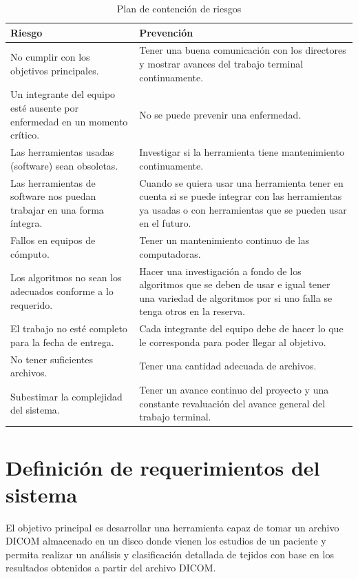 \documentclass[12pt]{report}
\begin{document}
\begin{table}[H]
\begin{center}
\begin{tabular}{|p{70mm}|p{70mm}|}
\hline
 Riesgo & Prevención \\
\hline \hline 
No cumplir con los objetivos principales. & Tener una buena comunicación con los directores y mostrar avances del trabajo terminal continuamente.\\
\hline
Un integrante del equipo esté ausente por enfermedad en un momento crítico. & No se puede prevenir una enfermedad.\\
\hline
Las herramientas usadas (software) sean obsoletas. & Investigar si la herramienta tiene mantenimiento continuamente. \\
\hline
Las herramientas de software nos puedan trabajar en una forma íntegra. & Cuando se quiera usar una herramienta tener en cuenta si se puede integrar con las herramientas ya usadas o con herramientas que se pueden usar en el futuro.\\
\hline
Fallos en equipos de cómputo. & Tener un mantenimiento continuo de las computadoras.\\
\hline
Los algoritmos no sean los adecuados conforme a lo requerido. & Hacer una investigación a fondo de los algoritmos que se deben de usar e igual tener una variedad de algoritmos por si uno falla se tenga otros en la reserva.\\
\hline
El trabajo no esté completo para la fecha de entrega. & Cada integrante del equipo debe de hacer lo que le corresponda para poder llegar al objetivo.\\
\hline
No tener suficientes archivos. & Tener una cantidad adecuada de archivos. \\
\hline
Subestimar la complejidad del sistema. & Tener un avance continuo del proyecto y una constante revaluación del avance general del trabajo terminal.\\
\hline
\end{tabular}
\caption{Plan de contención de riesgos}
\end{center}
\end{table}


\section{Definición de requerimientos del sistema}
El objetivo principal es desarrollar una herramienta capaz de tomar un archivo DICOM almacenado en un disco donde vienen los estudios de un paciente y permita realizar un análisis y clasificación detallada de tejidos con base en los resultados obtenidos a partir del archivo DICOM.\\ 
\end{document}
